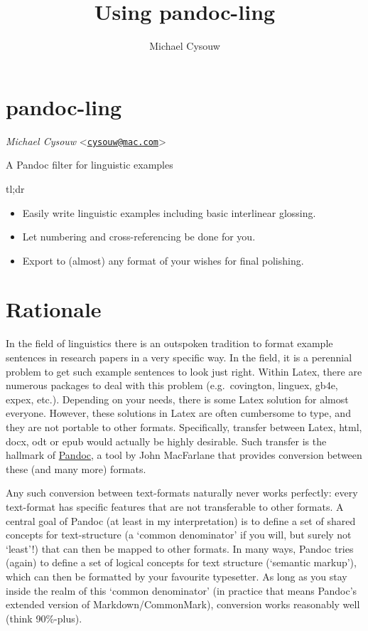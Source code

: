\documentclass[
]{article}
\title{Using pandoc-ling}
\author{Michael Cysouw}
\date{}
\providecommand{\tightlist}{%
  \setlength{\itemsep}{0pt}\setlength{\parskip}{0pt}}
\begin{document}
\maketitle

{
\setcounter{tocdepth}{3}
\tableofcontents
}
\hypertarget{pandoc-ling}{%
\section{pandoc-ling}\label{pandoc-ling}}

\emph{Michael Cysouw}
\textless{}\href{mailto:cysouw@mac.com}{\nolinkurl{cysouw@mac.com}}\textgreater{}

A Pandoc filter for linguistic examples

tl;dr

\begin{itemize}
\tightlist
\item
  Easily write linguistic examples including basic interlinear glossing.
\item
  Let numbering and cross-referencing be done for you.
\item
  Export to (almost) any format of your wishes for final polishing.
\end{itemize}

\hypertarget{rationale}{%
\section{Rationale}\label{rationale}}

In the field of linguistics there is an outspoken tradition to format
example sentences in research papers in a very specific way. In the
field, it is a perennial problem to get such example sentences to look
just right. Within Latex, there are numerous packages to deal with this
problem (e.g.~covington, linguex, gb4e, expex, etc.). Depending on your
needs, there is some Latex solution for almost everyone. However, these
solutions in Latex are often cumbersome to type, and they are not
portable to other formats. Specifically, transfer between Latex, html,
docx, odt or epub would actually be highly desirable. Such transfer is
the hallmark of \href{https://pandoc.org}{Pandoc}, a tool by John
MacFarlane that provides conversion between these (and many more)
formats.

Any such conversion between text-formats naturally never works
perfectly: every text-format has specific features that are not
transferable to other formats. A central goal of Pandoc (at least in my
interpretation) is to define a set of shared concepts for text-structure
(a `common denominator' if you will, but surely not `least'!) that can
then be mapped to other formats. In many ways, Pandoc tries (again) to
define a set of logical concepts for text structure (`semantic markup'),
which can then be formatted by your favourite typesetter. As long as you
stay inside the realm of this `common denominator' (in practice that
means Pandoc's extended version of Markdown/CommonMark), conversion
works reasonably well (think 90\%-plus).
\end{document}
